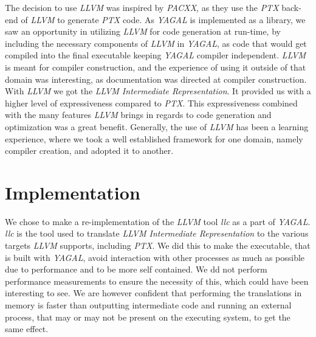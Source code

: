 The decision to use \textit{LLVM} was inspired by \textit{PACXX}, as they use the \textit{PTX} back-end of \textit{LLVM} to generate \textit{PTX} code. As \textit{YAGAL} is implemented as a library, we saw an opportunity in utilizing \textit{LLVM} for code generation at run-time, by including the necessary components of \textit{LLVM} in \textit{YAGAL}, as code that would get compiled into the final executable keeping \textit{YAGAL} compiler independent. \textit{LLVM} is meant for compiler construction, and the experience of using it outside of that domain was interesting, as documentation was directed at compiler construction. With \textit{LLVM} we got the \textit{LLVM Intermediate Representation}. It provided us with a higher level of expressiveness compared to \textit{PTX}. This expressiveness combined with the many features \textit{LLVM} brings in regards to code generation and optimization was a great benefit. Generally, the use of \textit{LLVM} has been a learning experience, where we took a well established framework for one domain, namely compiler creation, and adopted it to another.

\section{Implementation}

We chose to make a re-implementation of the \textit{LLVM} tool \textit{llc} as a part of \textit{YAGAL}. \textit{llc} is the tool used to translate \textit{LLVM Intermediate Representation} to the various targets \textit{LLVM} supports, including \textit{PTX}. We did this to make the executable, that is built with \textit{YAGAL}, avoid interaction with other processes as much as possible due to performance and to be more self contained. We dd not perform performance measurements to ensure the necessity of this, which could have been interesting to see. We are however confident that performing the translations in memory is faster than outputting intermediate code and running an external process, that may or may not be present on the executing system, to get the same effect.


